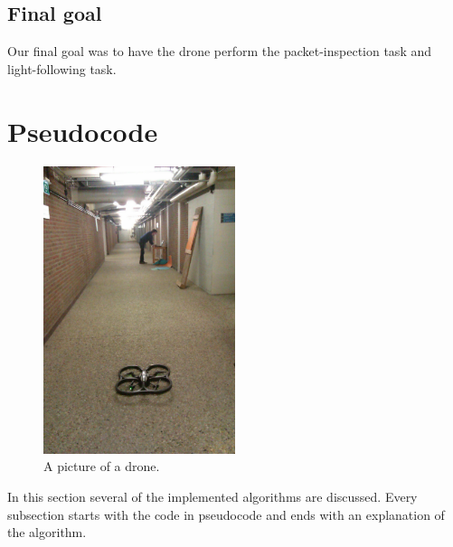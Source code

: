 \documentclass[a4paper,10pt]{article}
\begin{document}
\subsection{Final goal}
\label{sec:finalgoal}
Our final goal was to have the drone perform the packet-inspection task and
light-following task.



\section{Pseudocode}
\label{sec:pseudocode}
\begin{figure}[h!]
	\caption{A picture of a drone.}
	\centering
	\includegraphics[width=0.5\textwidth]{images/boringHallway}
\end{figure}

In this section several of the implemented algorithms are discussed. Every subsection starts with the code in pseudocode and ends with an explanation of the algorithm. 
\end{document}
